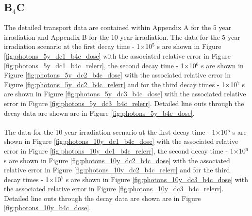 \documentclass[12pt]{article}
\begin{document}
\subsection{B$_4$C}
\label{sec:sdr_results_b4c}
The detailed transport data are contained within Appendix A for the 5 year irradiation
and Appendix B for the 10 year irradiation. The data for the 5 year irradiation scenario
at the first decay time - 1$\times$10$^5$ s are shown in Figure \ref{fig:photons_5y_dc1_b4c_dose} with the
associated relative error in Figure \ref{fig:photons_5y_dc1_b4c_relerr}, the second
decay time - 1$\times$10$^6$ s are shown in Figure \ref{fig:photons_5y_dc2_b4c_dose} with the
associated relative error in Figure \ref{fig:photons_5y_dc2_b4c_relerr} and for the
third decay times - 1$\times$10$^7$ s are shown in Figure \ref{fig:photons_5y_dc3_b4c_dose} with the
associated relative error in Figure \ref{fig:photons_5y_dc3_b4c_relerr}. Detailed line outs
through the decay data are shown are in Figure \ref{fig:photons_5y_b4c_dose}.
\\
\\
The data for the 10 year irradiation scenario
at the first decay time - 1$\times$10$^5$ s are shown in Figure \ref{fig:photons_10y_dc1_b4c_dose} with the
associated relative error in Figure \ref{fig:photons_10y_dc1_b4c_relerr}, the second
decay time - 1$\times$10$^6$ s are shown in Figure \ref{fig:photons_10y_dc2_b4c_dose} with the
associated relative error in Figure \ref{fig:photons_10y_dc2_b4c_relerr} and for the
third decay times - 1$\times$10$^7$ s are shown in Figure \ref{fig:photons_10y_dc3_b4c_dose} with the
associated relative error in Figure \ref{fig:photons_10y_dc3_b4c_relerr}. Detailed line outs
through the decay data are shown are in Figure \ref{fig:photons_10y_b4c_dose}.
\newpage
\end{document}
